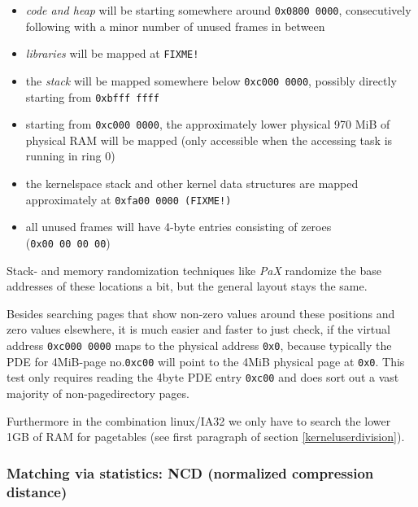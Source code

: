 \begin{itemize}

	\item \emph{code and heap} will be starting somewhere around
	\texttt{0x0800~0000}, consecutively following with a minor number of
	unused frames in between

	\item \emph{libraries} will be mapped at \texttt{FIXME!}

	\item the \emph{stack} will be mapped somewhere below
	\texttt{0xc000~0000}, possibly directly starting from
	\texttt{0xbfff~ffff}

	\item starting from \texttt{0xc000~0000}, the approximately lower
	physical 970 MiB of physical RAM will be mapped (only accessible when
	the accessing task is running in ring 0)

	\item the kernelspace stack and other kernel data structures are mapped
	approximately at \texttt{0xfa00~0000 (FIXME!)}

	\item all unused frames will have 4-byte entries consisting of zeroes
	(\texttt{0x00~00~00~00})

\end{itemize}

Stack- and memory randomization techniques like \emph{PaX} randomize the base
addresses of these locations a bit, but the general layout stays the same.

Besides searching pages that show non-zero values around these positions and
zero values elsewhere, it is much easier and faster to just check, if the
virtual address \texttt{0xc000~0000} maps to the physical address \texttt{0x0},
because typically the PDE for 4MiB-page no.\@ \texttt{0xc00} will point to the
4MiB physical page at \texttt{0x0}. This test only requires reading the 4byte
PDE entry \texttt{0xc00} and does sort out a vast majority of non-pagedirectory
pages.

Furthermore in the combination linux/IA32 we only have to search the lower 1GB
of RAM for pagetables (see first paragraph of section \ref{kerneluserdivision}).



\subsubsection{Matching via statistics: NCD (normalized compression distance)}


